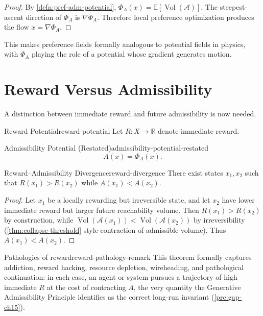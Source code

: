 \documentclass[12pt,twoside,openright]{book}
\newcommand{\adm}{\mathcal{A}}
\newcommand{\Vol}{\operatorname{Vol}}
\begin{document}
\begin{proof}
  By \cref{defn:pref-adm-potential}, $\Phi_A(x) = \mathbb{E}[\Vol(\adm)]$.
  The steepest-ascent direction of $\Phi_A$ is $\nabla\Phi_A$.
  Therefore local preference optimization produces the flow
  $\dot{x} = \nabla\Phi_A$.
\end{proof}

This makes preference fields formally analogous to
potential fields in physics, with $\Phi_A$ playing the role
of a potential whose gradient generates motion.

\section{Reward Versus Admissibility}
\label{sec:ch22-divergence}

A distinction between immediate reward and future
admissibility is now needed.

\begin{definition}{Reward Potential}{reward-potential}
  Let $R : X \to \mathbb{R}$ denote immediate reward.
\end{definition}

\begin{definition}{Admissibility Potential (Restated)}{admissibility-potential-restated}
  \[
    A(x) = \Phi_A(x).
  \]
\end{definition}

\begin{theorem}{Reward--Admissibility Divergence}{reward-divergence}
  There exist states $x_1, x_2$ such that
  $R(x_1) > R(x_2)$ while $A(x_1) < A(x_2)$.
\end{theorem}

\begin{proof}
  Let $x_1$ be a locally rewarding but irreversible state,
  and let $x_2$ have lower immediate reward but larger
  future reachability volume. Then $R(x_1) > R(x_2)$ by
  construction, while $\Vol(\adm(x_1)) < \Vol(\adm(x_2))$
  by irreversibility (\cref{thm:collapse-threshold}-style
  contraction of admissible volume). Thus $A(x_1) < A(x_2)$.
\end{proof}

\begin{remark}{Pathologies of reward}{reward-pathology-remark}
  This theorem formally captures addiction, reward hacking,
  resource depletion, wireheading, and pathological
  continuation: in each case, an agent or system pursues a
  trajectory of high immediate $R$ at the cost of
  contracting $A$, the very quantity the Generative
  Admissibility Principle identifies as the correct
  long-run invariant (\cref{prc:gap-ch15}).
\end{remark}
\end{document}
